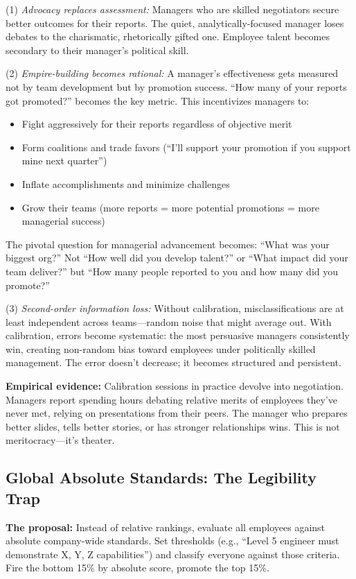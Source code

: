 \documentclass[12pt]{article}
\begin{document}
(1) \emph{Advocacy replaces assessment:} Managers who are skilled negotiators secure better outcomes for their reports. The quiet, analytically-focused manager loses debates to the charismatic, rhetorically gifted one. Employee talent becomes secondary to their manager's political skill.

(2) \emph{Empire-building becomes rational:} A manager's effectiveness gets measured not by team development but by promotion success. ``How many of your reports got promoted?'' becomes the key metric. This incentivizes managers to:
\begin{itemize}
\item Fight aggressively for their reports regardless of objective merit
\item Form coalitions and trade favors (``I'll support your promotion if you support mine next quarter'')
\item Inflate accomplishments and minimize challenges
\item Grow their teams (more reports = more potential promotions = more managerial success)
\end{itemize}

The pivotal question for managerial advancement becomes: ``What was your biggest org?'' Not ``How well did you develop talent?'' or ``What impact did your team deliver?'' but ``How many people reported to you and how many did you promote?''

(3) \emph{Second-order information loss:} Without calibration, misclassifications are at least independent across teams---random noise that might average out. With calibration, errors become systematic: the most persuasive managers consistently win, creating non-random bias toward employees under politically skilled management. The error doesn't decrease; it becomes structured and persistent.

\textbf{Empirical evidence:} Calibration sessions in practice devolve into negotiation. Managers report spending hours debating relative merits of employees they've never met, relying on presentations from their peers. The manager who prepares better slides, tells better stories, or has stronger relationships wins. This is not meritocracy---it's theater.

\subsection{Global Absolute Standards: The Legibility Trap}

\textbf{The proposal:} Instead of relative rankings, evaluate all employees against absolute company-wide standards. Set thresholds (e.g., ``Level 5 engineer must demonstrate X, Y, Z capabilities'') and classify everyone against those criteria. Fire the bottom 15\% by absolute score, promote the top 15\%.
\end{document}

